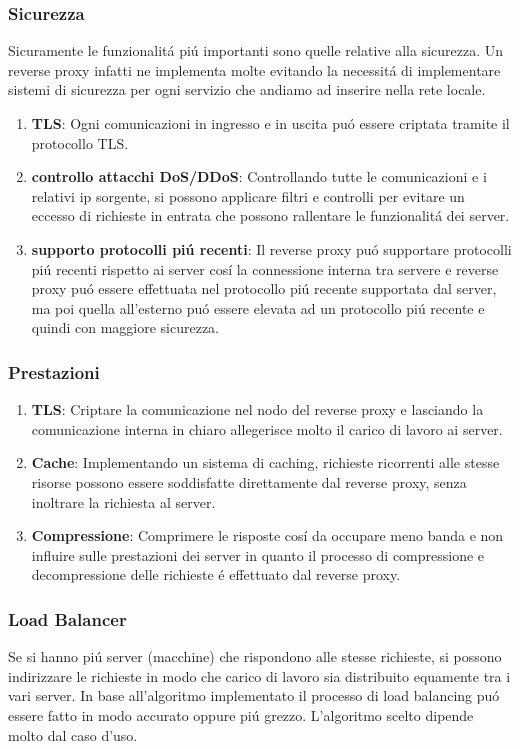 \subsubsection{Sicurezza}
Sicuramente le funzionalitá piú importanti sono quelle relative alla sicurezza. Un reverse proxy infatti ne implementa molte evitando la necessitá di implementare sistemi di sicurezza per ogni servizio che andiamo ad inserire nella rete locale.
\begin{enumerate}
  \item \textbf{TLS}: Ogni comunicazioni in ingresso e in uscita puó essere criptata tramite il protocollo TLS.
  \item \textbf{controllo attacchi DoS/DDoS}: Controllando tutte le comunicazioni e i relativi ip sorgente, si possono applicare filtri e controlli per evitare un eccesso di richieste in entrata che possono rallentare le funzionalitá dei server.
  \item \textbf{supporto protocolli piú recenti}: Il reverse proxy puó supportare protocolli piú recenti rispetto ai server cosí la connessione interna tra servere e reverse proxy puó essere effettuata nel protocollo piú recente supportata dal server, ma poi quella all'esterno puó essere elevata ad un protocollo piú recente e quindi con maggiore sicurezza.

\end{enumerate}

\subsubsection{Prestazioni}
\begin{enumerate}
  \item \textbf{TLS}: Criptare la comunicazione nel nodo del reverse proxy e lasciando la comunicazione interna in chiaro allegerisce molto il carico di lavoro ai server.
  \item \textbf{Cache}: Implementando un sistema di caching, richieste ricorrenti alle stesse risorse possono essere soddisfatte direttamente dal reverse proxy, senza inoltrare la richiesta al server.
  \item \textbf{Compressione}: Comprimere le risposte cosí da occupare meno banda e non influire sulle prestazioni dei server in quanto il processo di compressione e decompressione delle richieste é effettuato dal reverse proxy.
\end{enumerate}

\subsubsection{Load Balancer}
Se si hanno piú server (macchine) che rispondono alle stesse richieste, si possono indirizzare le richieste in modo che carico di lavoro sia distribuito equamente tra i vari server. In base all'algoritmo implementato il processo di load balancing puó essere fatto in modo accurato oppure piú grezzo. L'algoritmo scelto dipende molto dal caso d'uso.

